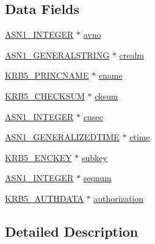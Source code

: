 \subsection*{Data Fields}
\begin{DoxyCompactItemize}
\item 
\hyperlink{crypto_2ossl__typ_8h_af4335399bf9774cb410a5e93de65998b}{A\+S\+N1\+\_\+\+I\+N\+T\+E\+G\+ER} $\ast$ \hyperlink{structkrb5__authenticator__st_ab617b5fa201d42eb0463f838d776ad15}{avno}
\item 
\hyperlink{crypto_2ossl__typ_8h_a7357d22f3b42ad606a72aad7f1668dd3}{A\+S\+N1\+\_\+\+G\+E\+N\+E\+R\+A\+L\+S\+T\+R\+I\+NG} $\ast$ \hyperlink{structkrb5__authenticator__st_a05e3cdbc38c44e21ecf75a0f735f18e5}{crealm}
\item 
\hyperlink{crypto_2krb5_2krb5__asn_8h_a1daa6bb370190eb1d769f39f88cf3bf2}{K\+R\+B5\+\_\+\+P\+R\+I\+N\+C\+N\+A\+ME} $\ast$ \hyperlink{structkrb5__authenticator__st_a8dc3c9f72edab0c323ebc085c5db6423}{cname}
\item 
\hyperlink{crypto_2krb5_2krb5__asn_8h_aedbdf525871fe98d8e8e8071ce610d7c}{K\+R\+B5\+\_\+\+C\+H\+E\+C\+K\+S\+UM} $\ast$ \hyperlink{structkrb5__authenticator__st_aaf104005bcc385f0d37716fa7afd17d8}{cksum}
\item 
\hyperlink{crypto_2ossl__typ_8h_af4335399bf9774cb410a5e93de65998b}{A\+S\+N1\+\_\+\+I\+N\+T\+E\+G\+ER} $\ast$ \hyperlink{structkrb5__authenticator__st_a1c8ed2a93b83412f5b8966e160cf2645}{cusec}
\item 
\hyperlink{crypto_2ossl__typ_8h_abd19ea5b527807ce3a516e6a41440f84}{A\+S\+N1\+\_\+\+G\+E\+N\+E\+R\+A\+L\+I\+Z\+E\+D\+T\+I\+ME} $\ast$ \hyperlink{structkrb5__authenticator__st_af7550b8068e035ce87cdd928f9dcecbf}{ctime}
\item 
\hyperlink{crypto_2krb5_2krb5__asn_8h_a539dced1a1d6118b8a30c070d9ae77d0}{K\+R\+B5\+\_\+\+E\+N\+C\+K\+EY} $\ast$ \hyperlink{structkrb5__authenticator__st_a49e0ad3c661bdc0e7ef6ad052b5951b5}{subkey}
\item 
\hyperlink{crypto_2ossl__typ_8h_af4335399bf9774cb410a5e93de65998b}{A\+S\+N1\+\_\+\+I\+N\+T\+E\+G\+ER} $\ast$ \hyperlink{structkrb5__authenticator__st_a7ffb86e0e335fab7dbaa7167d9f8823b}{seqnum}
\item 
\hyperlink{crypto_2krb5_2krb5__asn_8h_a573af9af7bc0f9c65d23828dc4f12a4c}{K\+R\+B5\+\_\+\+A\+U\+T\+H\+D\+A\+TA} $\ast$ \hyperlink{structkrb5__authenticator__st_abcc2b77fcfc60c1ffcfa0c935813a49a}{authorization}
\end{DoxyCompactItemize}


\subsection{Detailed Description}



